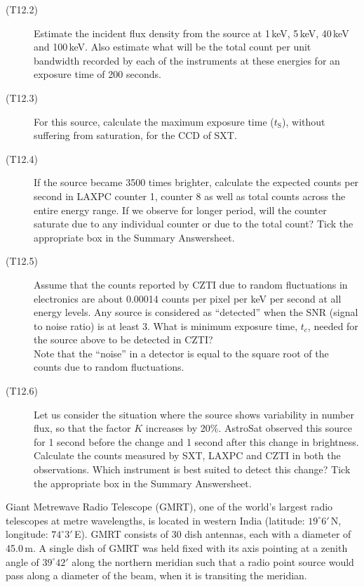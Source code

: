 \begin{description}
\item[(T12.2)] Estimate the incident flux density from the source at 1\,keV,
  5\,keV, 40\,keV and 100\,keV. Also estimate what will be the total count per
  unit bandwidth recorded by each of the instruments at these energies for an
  exposure time of 200 seconds.
\item[(T12.3)] For this source, calculate the maximum exposure time
  ($t_{\mathrm{S}}$), without suffering from saturation, for the CCD of SXT.
\item[(T12.4)] If the source became 3500 times brighter, calculate the expected
  counts per second in LAXPC counter 1, counter 8 as well as total counts
  across the entire energy range. If we observe for longer period, will the
  counter saturate due to any individual counter or due to the total count?
  Tick the appropriate box in the Summary Answersheet.
\item[(T12.5)] Assume that the counts reported by CZTI due to random
  fluctuations in electronics are about 0.00014 counts per pixel per keV per
  second at all energy levels. Any source is considered as ``detected'' when
  the SNR (signal to noise ratio) is at least 3. What is minimum exposure time,
  $t_c$, needed for the source above to be detected in CZTI?\\
  Note that the ``noise'' in a detector is equal to the square root of the
  counts due to random fluctuations.
\item[(T12.6)] Let us consider the situation where the source shows variability
  in number flux, so that the factor $K$ increases by 20\%. AstroSat observed
  this source for 1 second before the change and 1 second after this change in
  brightness. Calculate the counts measured by SXT, LAXPC and CZTI in both the
  observations. Which instrument is best suited to detect this change? Tick the
  appropriate box in the Summary Answersheet.
\end{description}

Giant Metrewave Radio Telescope (GMRT), one of the world's largest radio
telescopes at metre wavelengths, is located in western India (latitude:
$19^\circ 6'$\,N, longitude: $74^\circ 3'$\,E). GMRT consists of 30 dish
antennas, each with a diameter of 45.0\,m. A single dish of GMRT was held fixed
with its axis pointing at a zenith angle of $39^\circ 42'$ along the northern
meridian such that a radio point source would pass along a diameter of the
beam, when it is transiting the meridian.

